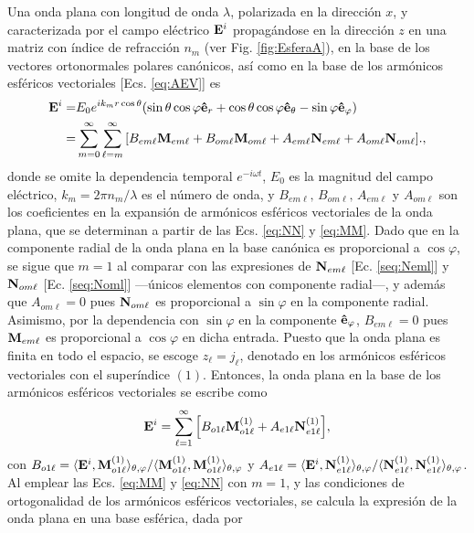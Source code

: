 Una onda plana con longitud de onda $\lambda$, polarizada en la dirección $x$, y caracterizada por el campo eléctrico $\vb{E}^i$ propagándose en la dirección $z$ en una matriz con índice de refracción $n_m$ (ver Fig. \ref{fig:EsferaA}), en la base de los vectores ortonormales polares canónicos, así como en la base de los armónicos esféricos vectoriales [Ecs. \eqref{eq:AEV}] es
	\begin{align*}
\vb{E}^i = & E_0 e^{ik_mr\cos\theta} \qty(\sin\theta\cos\varphi \vu{e}_r + 
								\cos\theta\cos\varphi\vu{e}_\theta-\sin\varphi\vu{e}_\varphi)\notag\\
	 =& \sum_{m=0}^\infty\sum_{\ell=m}^\infty \qty[ B_{em\ell}\vb{M}_{em\ell} 
	 	+ B_{om\ell}\vb{M}_{om\ell} +A_{em\ell}\vb{N}_{em\ell} + A_{om\ell}\vb{N}_{om\ell}].,
	\end{align*}
donde se omite la dependencia temporal $e^{-i\omega t}$, $E_0$ es la magnitud del campo eléctrico, $k_m=2\pi n_m/\lambda$ es el número de onda,  y  $B_{em\ell},\, B_{om\ell},\, A_{em\ell}$ y $ A_{om\ell}$ son los coeficientes en la expansión de armónicos esféricos vectoriales de la onda plana, que se determinan a partir de las Ecs. \eqref{eq:NN} y \eqref{eq:MM}. Dado que en la componente radial de la onda plana en la base canónica es proporcional a $\cos\varphi$, se sigue que $m=1$ al comparar con las expresiones de $\vb{N}_{em\ell}$ [Ec. \eqref{seq:Neml}] y $\vb{N}_{om\ell}$ [Ec. \eqref{seq:Noml}] ---únicos elementos con componente radial---, y además que $A_{om\ell}=0$ pues $\vb{N}_{om\ell}$ es proporcional a $\sin\varphi$ en la componente radial. Asimismo, por la dependencia con $\sin\varphi$ en la componente  $\vu{e}_\varphi$, $B_{em\ell}=0$ pues $\vb{M}_{em\ell}$ es proporcional a $\cos\varphi$ en dicha entrada. Puesto que la onda plana es finita en todo el espacio, se escoge $z_\ell = j_\ell$, denotado en los armónicos esféricos vectoriales con el superíndice $(1)$. Entonces, la onda plana en la base de los armónicos esféricos vectoriales se escribe como
	\begin{equation}
	\vb{E}^i = \sum_{\ell=1}^\infty \qty[B_{o1\ell}\vb{M}_{o1\ell}^{(1)} + A_{e1\ell}\vb{N}_{e1\ell}^{(1)}],
	\end{equation}
con $B_{o1\ell} = \langle \vb{E}^i, \vb{M}_{o1\ell}^{(1)}  \rangle_{\theta,\varphi} / \langle \vb{M}_{o1\ell}^{(1)} ,\vb{M}_{o1\ell}^{(1)} \rangle_{\theta,\varphi}$ y $ A_{e1\ell} = \langle \vb{E}^i, \vb{N}_{e1\ell}^{(1)} \rangle_{\theta,\varphi} / \langle \vb{N}_{e1\ell}^{(1)},\vb{N}_{e1\ell}^{(1)} \rangle_{\theta,\varphi}$. Al emplear las Ecs. \eqref{eq:MM} y \eqref{eq:NN} con $m=1$, y las condiciones de ortogonalidad de los armónicos esféricos vectoriales, se calcula la expresión de la onda plana en una base esférica, dada por
